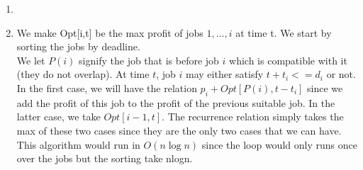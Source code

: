 \begin{enumerate}[1.]
	
	\item
	\item
	We make Opt[i,t] be the max profit of jobs $1,\dots,i $ at time t. We start by sorting the jobs by deadline.\\
	We let $P(i)$ signify the job that is before job $i$ which is compatible with it (they do not overlap).
	At time $t$, job $i$ may either satisfy $t+t_i <= d_i$ or not. \\
	In the first case, we will have the relation $p_i+Opt[P(i), t-t_i]$ since we add the profit of this job to the profit of the previous suitable job. In the latter case, we take $Opt[i-1, t]$. The recurrence relation simply takes the max of these two cases since they are the only two cases that we can have. \\
	This algorithm would run in $O(n \log n)$ since the loop would only runs once over the jobs but the sorting take nlogn.
	

\end{enumerate}
